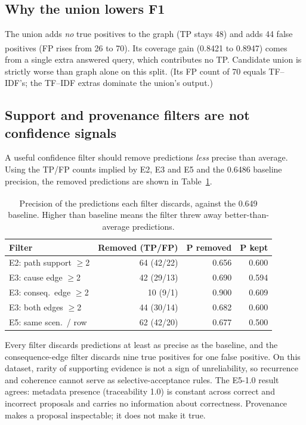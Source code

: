 \documentclass[10pt,twocolumn,a4paper]{extarticle}
\newcommand{\derived}{\textsuperscript{\textdagger}}
\newcommand{\tblsize}{\footnotesize}
\begin{document}
\subsection{Why the union lowers F1}
The union adds \emph{no} true positives to the graph (TP stays 48) and adds 44 false positives (FP rises from 26 to 70).\derived{} Its coverage gain (0.8421 to 0.8947) comes from a single extra answered query, which contributes no TP. Candidate union is strictly worse than graph alone on this split. (Its FP count of 70 equals TF--IDF's; the TF--IDF extras dominate the union's output.)

\subsection{Support and provenance filters are not confidence signals}\label{sec:filters}
A useful confidence filter should remove predictions \emph{less} precise than average. Using the TP/FP counts implied by E2, E3 and E5 and the 0.6486 baseline precision, the removed predictions are shown in Table~\ref{tab:removed}.

\begin{table}[t]
\centering
\caption{Precision of the predictions each filter discards\derived{}, against the 0.649 baseline. Higher than baseline means the filter threw away better-than-average predictions.}
\label{tab:removed}
\renewcommand{\tblsize}{\scriptsize}
\begin{tabular}{@{}l r r r@{}}
\toprule
\textbf{Filter} & \textbf{Removed (TP/FP)} & \textbf{P removed} & \textbf{P kept}\\
\midrule
E2: path support $\ge$2 & 64 (42/22) & 0.656 & 0.600\\
E3: cause edge $\ge$2 & 42 (29/13) & 0.690 & 0.594\\
E3: conseq.\ edge $\ge$2 & 10 (9/1) & 0.900 & 0.609\\
E3: both edges $\ge$2 & 44 (30/14) & 0.682 & 0.600\\
E5: same scen.\ / row & 62 (42/20) & 0.677 & 0.500\\
\bottomrule
\end{tabular}
\end{table}

Every filter discards predictions at least as precise as the baseline, and the consequence-edge filter discards nine true positives for one false positive. On this dataset, rarity of supporting evidence is not a sign of unreliability, so recurrence and coherence cannot serve as selective-acceptance rules. The E5-1.0 result agrees: metadata presence (traceability 1.0) is constant across correct and incorrect proposals and carries no information about correctness. Provenance makes a proposal inspectable; it does not make it true.
\end{document}
